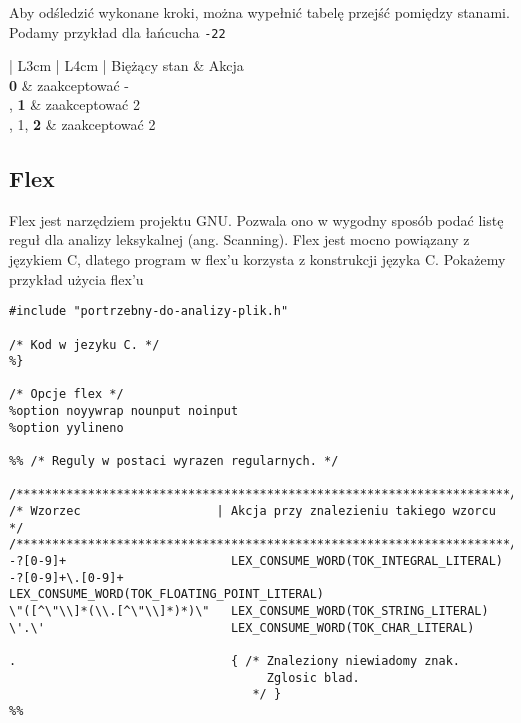 \documentclass[a4paper, 12pt]{extarticle}
\newcommand{\spacing}{\vskip 0.5cm}
\begin{document}
			Aby odśledzić wykonane kroki, można wypełnić tabelę przejść pomiędzy stanami. Podamy przykład dla
			łańcucha \texttt{-22}

			\spacing
			\spacing

		\begin{center}
			\setlength{\tabcolsep}{0.5em}
			\renewcommand{\arraystretch}{1.2}
			\begin{tabular}{ | L{3cm} | L{4cm} | }
				\hline
				Biężący stan        & Akcja \\
				\hline
				\textbf{0}          & zaakceptować - \\
				, \textbf{1}       & zaakceptować 2 \\
				, 1, \textbf{2}    & zaakceptować 2 \\
				\hline
			\end{tabular}
		\end{center}
		
		\newpage

	\subsection{Flex}

		Flex jest narzędziem projektu GNU. Pozwala ono w wygodny sposób podać listę reguł dla analizy
		leksykalnej (ang. Scanning). Flex jest mocno powiązany z językiem C, dlatego program w flex'u
		korzysta z konstrukcji języka C. Pokażemy przykład użycia flex'u
		
		\spacing
		
		\begin{lstlisting}[caption={Przykład użycia flex}, label={lst:flex-example}]
%{
#include "portrzebny-do-analizy-plik.h"

/* Kod w jezyku C. */
%}

/* Opcje flex */
%option noyywrap nounput noinput
%option yylineno

%% /* Reguly w postaci wyrazen regularnych. */

/*********************************************************************/
/* Wzorzec                   | Akcja przy znalezieniu takiego wzorcu */
/*********************************************************************/
-?[0-9]+                       LEX_CONSUME_WORD(TOK_INTEGRAL_LITERAL)
-?[0-9]+\.[0-9]+               LEX_CONSUME_WORD(TOK_FLOATING_POINT_LITERAL)
\"([^\"\\]*(\\.[^\"\\]*)*)\"   LEX_CONSUME_WORD(TOK_STRING_LITERAL)
\'.\'                          LEX_CONSUME_WORD(TOK_CHAR_LITERAL)

.                              { /* Znaleziony niewiadomy znak.
                                    Zglosic blad.
                                  */ }
%%
		\end{lstlisting}
\end{document}
